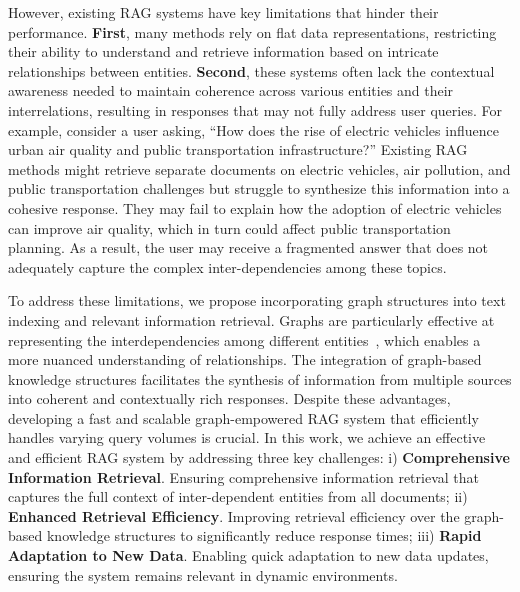 \documentclass{article} %
\begin{document}
However, existing RAG systems have key limitations that hinder their performance. \textbf{First}, many methods rely on flat data representations, restricting their ability to understand and retrieve information based on intricate relationships between entities. \textbf{Second}, these systems often lack the contextual awareness needed to maintain coherence across various entities and their interrelations, resulting in responses that may not fully address user queries. For example, consider a user asking, ``How does the rise of electric vehicles influence urban air quality and public transportation infrastructure?'' Existing RAG methods might retrieve separate documents on electric vehicles, air pollution, and public transportation challenges but struggle to synthesize this information into a cohesive response. They may fail to explain how the adoption of electric vehicles can improve air quality, which in turn could affect public transportation planning. As a result, the user may receive a fragmented answer that does not adequately capture the complex inter-dependencies among these topics.

To address these limitations, we propose incorporating graph structures into text indexing and relevant information retrieval. Graphs are particularly effective at representing the interdependencies among different entities~\cite{rampavsek2022recipe}, which enables a more nuanced understanding of relationships. The integration of graph-based knowledge structures facilitates the synthesis of information from multiple sources into coherent and contextually rich responses. Despite these advantages, developing a fast and scalable graph-empowered RAG system that efficiently handles varying query volumes is crucial. In this work, we achieve an effective and efficient RAG system by addressing three key challenges: i) \textbf{Comprehensive Information Retrieval}. Ensuring comprehensive information retrieval that captures the full context of inter-dependent entities from all documents; ii) \textbf{Enhanced Retrieval Efficiency}. Improving retrieval efficiency over the graph-based knowledge structures to significantly reduce response times; iii) \textbf{Rapid Adaptation to New Data}. Enabling quick adaptation to new data updates, ensuring the system remains relevant in dynamic environments.
\end{document}
